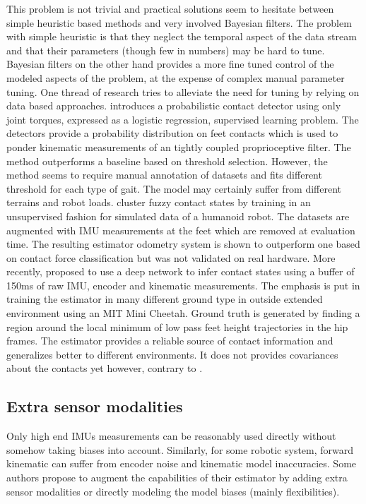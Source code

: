 This problem is not trivial and practical solutions seem to hesitate between simple heuristic based methods and very involved Bayesian filters. 
The problem with simple heuristic is that they neglect the temporal aspect of the data stream and that their parameters (though few in numbers) may be hard to tune.
Bayesian filters on the other hand provides a more fine tuned control of the modeled aspects of the problem, at the expense of complex manual parameter tuning.
One thread of research tries to alleviate the need for tuning by relying on data based approaches. \cite{camurri2017probabilistic} introduces a probabilistic 
contact detector using only joint torques, expressed as a logistic regression, supervised learning problem. The detectors provide a probability distribution on feet contacts which is used to ponder kinematic
measurements of an tightly coupled proprioceptive filter. The method outperforms a baseline based on threshold selection. However, the method seems to require manual annotation of datasets and 
fits different threshold for each type of gait. The model may certainly suffer from different terrains and robot loads. 
\cite{rotella2018unsupervised} cluster fuzzy contact states by training in an unsupervised fashion for simulated data of a humanoid robot. The datasets are augmented
with IMU measurements at the feet which are removed at evaluation time. The resulting estimator odometry system is shown to outperform one based on contact force classification
but was not validated on real hardware. More recently, \cite{lin2021deep} proposed to use a deep network to infer contact states using a buffer of 150ms of raw IMU, 
encoder and kinematic measurements. The emphasis is put in training the estimator in many different ground type in outside extended environment using an MIT Mini Cheetah. Ground truth is generated
by finding a region around the local minimum of low pass feet height trajectories in the hip frames. The estimator provides a reliable source of contact information 
and generalizes better to different environments. It does not provides covariances about the contacts yet however, contrary to \cite{camurri2017probabilistic}.  



\subsection{Extra sensor modalities}
Only high end IMUs measurements can be reasonably used directly without somehow taking biases into account.
Similarly, for some robotic system, forward kinematic can suffer from encoder noise and kinematic model inaccuracies. Some authors propose to 
augment the capabilities of their estimator by adding extra sensor modalities or directly modeling the model biases (mainly flexibilities).

